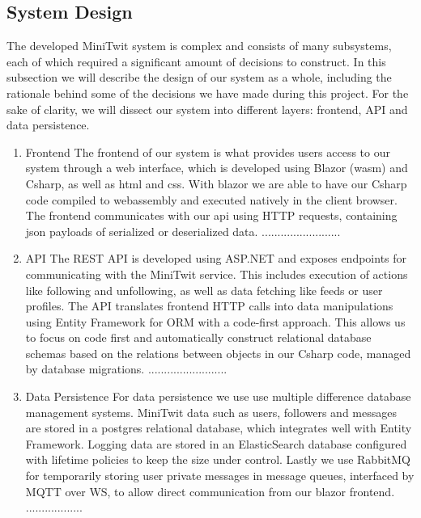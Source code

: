 \begin{itemize}
  \subsection{System Design}
  The developed MiniTwit system is complex and consists of many subsystems, each of which required a significant amount of decisions to construct.
  In this subsection we will describe the design of our system as a whole, including the rationale behind some of the decisions we have made during this project.
  \newline
  For the sake of clarity, we will dissect our system into different layers: frontend, API and data persistence.
  \begin{enumerate}
    \item Frontend\newline
    The frontend of our system is what provides users access to our system through a web interface, which is developed using Blazor (wasm) and Csharp, as well as html and css.
    With blazor we are able to have our Csharp code compiled to webassembly and executed natively in the client browser.
    The frontend communicates with our api using HTTP requests, containing json payloads of serialized or deserialized data.
    .........................

    \item API\newline
    The REST API is developed using ASP.NET and exposes endpoints for communicating with the MiniTwit service. 
    This includes execution of actions like following and unfollowing, as well as data fetching like feeds or user profiles.
    The API translates frontend HTTP calls into data manipulations using Entity Framework for ORM with a code-first approach.
    This allows us to focus on code first and automatically construct relational database schemas based on the relations between objects in our Csharp code, managed by database migrations.
    .........................

    \item Data Persistence\newline
    For data persistence we use use multiple difference database management systems. 
    MiniTwit data such as users, followers and messages are stored in a postgres relational database, which integrates well with Entity Framework.
    Logging data are stored in an ElasticSearch database configured with lifetime policies to keep the size under control.
    Lastly we use RabbitMQ for temporarily storing user private messages in message queues, interfaced by MQTT over WS, to allow direct communication from our blazor frontend.
    ..................


\end{enumerate}
\end{itemize}
